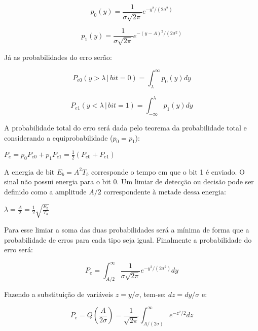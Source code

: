 \begin{equation} \label{q06:4}
    p_0(y) = \frac{1}{\sigma\sqrt{2\pi}} e^{-y^2/(2\sigma^2)}
\end{equation}

\begin{equation} \label{q06:5}
    p_1(y) = \frac{1}{\sigma\sqrt{2\pi}} e^{-(y-A)^2/(2\sigma^2)}
\end{equation}

Já as probabilidades do erro serão:

\begin{equation} \label{q06:6}
    P_{e0}(y>\lambda \, | \, bit=0)= \int_{\lambda}^{\infty} p_0(y)dy
\end{equation}

\begin{equation} \label{q06:7}
    P_{e1}(y<\lambda \, | \, bit=1)= \int_{-\infty}^{\lambda} p_1(y)dy
\end{equation}


A probabilidade total do erro será dada pelo teorema da probabilidade total e considerando a equiprobabilidade ($p_0 = p_1$):

\begin{center}
    $P_e = p_0 P_{e0} + p_1 P_{e1} = \frac{1}{2} (P_{e0} + P_{e1})$
\end{center}

A energia de bit $E_b = A^2T_b$ corresponde o tempo em que o bit 1 é enviado. O sinal não possui energia para o bit 0. Um limiar de detecção ou decisão pode ser definido como a amplitude $A/2$ correspondente à metade dessa energia:

\begin{center}
    $\lambda = \frac{A}{2} = \frac{1}{2} \sqrt{\frac{E_b}{T_b}}$
\end{center}

Para esse limiar a soma das duas probabilidades será a mínima de forma que a probabilidade de erros para cada tipo seja igual. Finalmente a probabilidade do erro será:

\begin{equation} \label{q06:8}
    P_e= \int_{A/2}^{\infty} \frac{1}{\sigma\sqrt{2\pi}} e^{-y^2/(2\sigma^2)}dy
\end{equation}

Fazendo a substituição de variáveis $z = y/\sigma$, tem-se: $dz = dy/\sigma$ e:

\begin{equation} \label{q06:9}
    P_e= Q\left(\frac{A}{2\sigma}\right) = \frac{1}{\sqrt{2\pi}} \int_{A/(2\sigma)}^{\infty}  e^{-z^2/2}dz
\end{equation}

